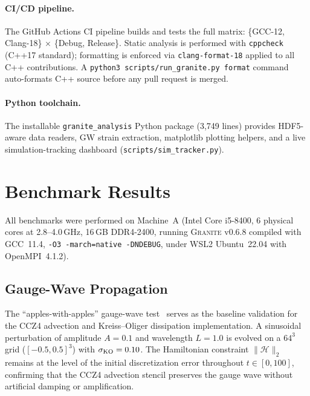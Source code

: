 \documentclass[aps,prd,twocolumn,superscriptaddress,nofootinbib,showpacs,
               longbibliography]{revtex4-2}
\newcommand{\granite}{\textsc{Granite}}
\newcommand{\code}[1]{\texttt{#1}}
\newcommand{\norm}[1]{\|#1\|}
\begin{document}
\paragraph{CI/CD pipeline.}
The GitHub Actions CI pipeline builds and tests the full matrix:
\{GCC-12, Clang-18\} $\times$ \{Debug, Release\}.
Static analysis is performed with \code{cppcheck} (C++17 standard);
formatting is enforced via \code{clang-format-18} applied to all C++
contributions.
A \code{python3 scripts/run\_granite.py format} command
auto-formats C++ source before any pull request is merged.

\paragraph{Python toolchain.}
The installable \code{granite\_analysis} Python package (3{,}749 lines)
provides HDF5-aware data readers, GW strain extraction, matplotlib
plotting helpers, and a live simulation-tracking dashboard
(\code{scripts/sim\_tracker.py}).

\section{Benchmark Results}
\label{sec:benchmarks}

All benchmarks were performed on Machine~A (Intel Core i5-8400, 6 physical
cores at 2.8--4.0\,GHz, 16\,GB DDR4-2400, running \granite{} v0.6.8 compiled
with GCC~11.4, \code{-O3 -march=native -DNDEBUG}, under WSL2 Ubuntu~22.04
with OpenMPI~4.1.2).

\subsection{Gauge-Wave Propagation}
\label{sec:gw_bench}

The ``apples-with-apples'' gauge-wave test~\cite{Alcubierre2008} serves as
the baseline validation for the CCZ4 advection and Kreiss--Oliger
dissipation implementation.
A sinusoidal perturbation of amplitude $A = 0.1$ and wavelength $L = 1.0$
is evolved on a $64^3$ grid ($[-0.5, 0.5]^3$) with $\sigma_{\rm KO} = 0.10$.
The Hamiltonian constraint $\norm{\mathcal{H}}_2$ remains at the level of
the initial discretization error throughout $t \in [0, 100]$, confirming
that the CCZ4 advection stencil preserves the gauge wave without artificial
damping or amplification.
\end{document}
